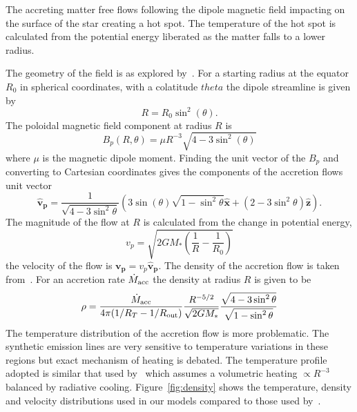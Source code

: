 \documentclass[fleqn,usenatbib]{mnras}
\begin{document}
The accreting matter free flows following the dipole magnetic field impacting on the surface of the star creating a hot spot. The temperature of the hot spot is calculated from the potential energy liberated as the matter falls to a lower radius.

The geometry of the field is as explored by~\citet{1991ApJ...370L..39K,1977ApJ...217..578G}. For a starting radius at the equator $R_{0}$ in spherical coordinates, with a colatitude $theta$ the dipole streamline is given by
\begin{equation}
    R = R_{0}\sin^{2}(\theta).
\end{equation}
The poloidal magnetic field component at radius $R$ is
\begin{equation}
    B_{p}(R,\theta) = \mu R^{-3}\sqrt{4-3\sin^{2}(\theta )}
\end{equation}
where $\mu$ is the magnetic dipole moment. Finding the unit vector of the $B_p$ and converting to Cartesian coordinates gives the components of the accretion flows unit vector
\begin{equation}
     \mathbf{\hat{v}_p} = \frac{1}{\sqrt{4-3\sin^2\theta}}\left(3\sin(\theta)\sqrt{1-\sin^2\theta}\mathbf{\hat{x}}+(2-3\sin^2\theta)\mathbf{\hat{z}}\right).
\end{equation}
The magnitude of the flow at $R$ is calculated from the change in potential energy,
\begin{equation}
    v_p = \sqrt{2GM_{\ast}(\frac{1}{R} - \frac{1}{R_0})}
\end{equation}
the velocity of the flow is $\mathbf{v_p}=v_p\mathbf{\hat{v}_p}$.
The density of the accretion flow is taken from~\citep{Hartmann:1994tl}. For an accretion rate $\dot{M}_{\rm acc}$ the density at radius $R$ is given to be
\begin{equation}
    \rho = \frac{\dot{M}_{\rm acc}}{4\pi(1/R_T - 1/R_{\rm out})}\frac{R^{-5/2}}{\sqrt{2GM_{\ast}}}\frac{\sqrt{4-3\sin^2\theta}}{\sqrt{1-\sin^2\theta}}
\end{equation}
The temperature distribution of the accretion flow is more problematic. The synthetic emission lines are very sensitive to temperature variations in these regions but exact mechanism of heating is debated. The temperature profile adopted is similar that used by~\citet{Hartmann:1994tl,1998AJ....116..455M} which assumes a volumetric heating $\propto R^{-3}$ balanced by radiative cooling. Figure~\ref{fig:density} shows the temperature, density and velocity distributions used in our models compared to those used by~\citet{1998AJ....116..455M}.
\end{document}
